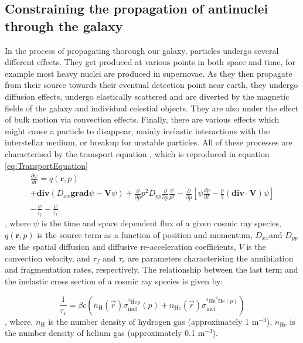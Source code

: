 \subsection{Constraining the propagation of antinuclei through the galaxy}\label{sec:Propagation}
In the process of propagating thorough our galaxy, particles undergo several different effects. They get produced at various points in both space and time, for example most heavy nuclei are produced in supernovae\cite{}. As they then propagate from their source towards their eventual detection point near earth, they undergo diffusion effects, undergo elastically scattered and are diverted by the magnetic fields of the galaxy and individual celestial objects. They are also under the effect of bulk motion via convection effects. Finally, there are various effects which might cause a particle to disappear, mainly inelastic interactions with the interstellar medium, or breakup for unstable particles. All of these processes are characterised by the transport equation \cite{}, which is reproduced in equation \ref{eq:TransportEquation}
\begin{equation}
    \label{eq:TransportEquation}
    \begin{split}
        \frac{\partial\psi}{dt} = q(\textbf{r},p) \\
        + \mathrm{\textbf{div}}(D_{xx}\mathrm{\textbf{grad}}\psi - \textbf{V}\psi) + \frac{\partial}{\partial p}p^2D_{pp} \frac{\partial}{\partial p}\frac{\psi}{p^2} - \frac{\partial}{\partial p} \left[ \psi \frac{dp}{d t}   -\frac{p}{3} (\mathrm{\textbf{div}}\cdot  \mathrm{\textbf{V}} )\psi              \right] \\ 
        - \frac{\psi}{\tau_f}-\frac{\psi}{\tau_r}
    \end{split}
    
\end{equation}
, where $\psi$ is the time and space dependent flux of a given cosmic ray species, $q(\textbf{r},p)$ is the source term as a function of position and momentum, $D_{xx}$and $D_{pp}$ are the spatial diffusion and diffusive re-acceleration coefficients, $V$ is the convection velocity, and $\tau_f$ and $\tau_r$ are parameters characterising the annihilation and fragmentation rates, respectively. The relationship between the last term and the inelastic cross section of a cosmic ray species is given by: 

\begin{equation}\label{eq:annihilation_lossTerm_relation}
    \frac{1}{\tau_r} = \beta c \left( n_\mathrm{H}(\vec{r})\sigma_{\mathrm{inel}}^{^3\mathrm{\overline{He}p}} (p) + n_{\mathrm{He}}(\vec{r})\sigma_{\mathrm{inel}}^{^3\mathrm{\overline{He}^4He} (p)} 
    \right)
\end{equation},
where, $n_\mathrm{H}$ is the number density of hydrogen gas (approximately 1 m$^{-3}$), $n_\mathrm{He}$ is the number density of helium gas (approximately 0.1 m$^{-3}$). \\%

